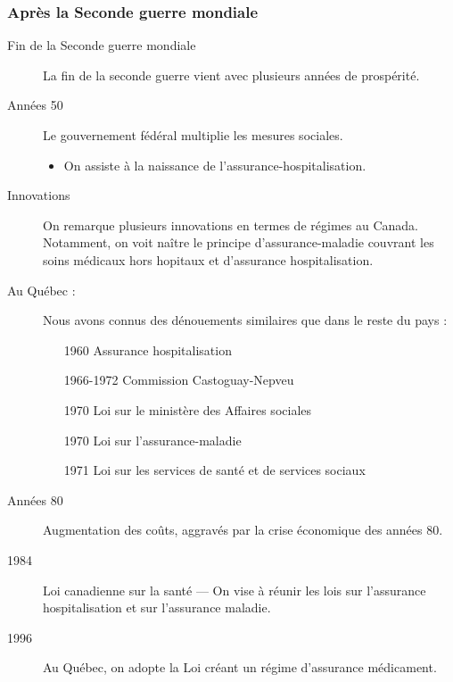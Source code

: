 \documentclass[10pt, french]{article}
\begin{document}
\begin{multicols*}{3}
\subsubsection*{Après la Seconde guerre mondiale}
\begin{description}
\item[Fin de la Seconde guerre mondiale] La fin de la seconde guerre vient avec plusieurs années de prospérité.
\item[Années 50] Le gouvernement fédéral multiplie les mesures sociales.
	\begin{itemize}
	\item	On assiste à la naissance de l'assurance-hospitalisation.
	\end{itemize}
\item[Innovations] On remarque plusieurs innovations en termes de régimes au Canada. Notamment, on voit naître le principe d'assurance-maladie couvrant les soins médicaux hors hopitaux et d'assurance hospitalisation.
\item[Au Québec : ] Nous avons connus des dénouements similaires que dans le reste du pays :
	\begin{itemize}
	\item[1960]	Assurance hospitalisation
	\item[1966-1972] Commission Castoguay-Nepveu
	\item[1970] Loi sur le ministère des Affaires sociales 
	\item[1970]	Loi sur l'assurance-maladie
	\item[1971]	Loi sur les services de santé et de services sociaux
	\end{itemize}	
\item[Années 80] Augmentation des coûts, aggravés par la crise économique des années 80.
\item[1984] Loi canadienne sur la santé --- On vise à réunir les lois sur l'assurance hospitalisation et sur l'assurance maladie.
\item[1996] Au Québec, on adopte la Loi créant un régime d'assurance médicament. 
\end{description}



\end{multicols*}
\end{document}
